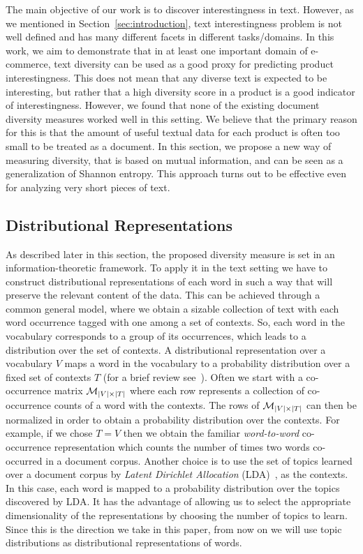 The main objective of our work is to discover interestingness in text. However,
as we mentioned in Section~\ref{sec:introduction}, text interestingness problem is not well defined and has many different facets in different tasks/domains. In this work, we aim to demonstrate that in at least one important domain of e-commerce, text diversity can be used as a good proxy for 
predicting product interestingness. This does not mean that any diverse text is
expected to be interesting, but rather that a high diversity score in
a product is a good indicator of interestingness. However, we found
that none of the existing document diversity measures worked well in this setting. We believe
that the primary reason for this is that the amount of useful textual
data for each product is often too small to be treated as a document. 
In this section, we propose a new way of measuring diversity, that is
based on mutual information, and can be seen as a generalization of
Shannon entropy. This approach turns out to be effective even for
analyzing very short pieces of text. 


\subsection{Distributional Representations}
\label{sec:distributional-representations}
As described later in this section, the proposed diversity measure
is set in an information-theoretic framework. 
To apply it in the text setting we have to construct distributional
representations of each word in such a way that will preserve the
relevant content of the data.
This can be achieved through a common general model,
where we obtain a sizable collection of text with each word
occurrence tagged with one among a set of
contexts. 
So, each word in the vocabulary
corresponds to a group of its occurrences, which leads to a
distribution over the set of contexts. A distributional representation
over a vocabulary $V$ maps a word in the vocabulary to a  
probability distribution over a fixed set of contexts $T$  (for a brief review
see~\cite{Turian10wordrepresentations}). Often we start with a
co-occurrence matrix ${\mathcal M}_{|V|\times|T|}$ where each row represents a
collection of co-occurrence counts of a word with the contexts. The
rows of ${\mathcal M}_{|V|\times|T|}$ can then  be normalized in order to
obtain a probability distribution over the contexts.
For example, if we chose $T=V$ then we obtain the familiar {\sl
  word-to-word} co-occurrence representation which counts the number 
of times two words co-occurred in a document corpus. Another choice is
to use the set of topics learned over a document 
corpus by {\sl Latent Dirichlet Allocation}
(LDA)~\cite{Blei:2003:LDA:944919.944937}, as the contexts. In this case, each word is mapped to a probability distribution over the topics discovered by LDA. It has the
advantage of allowing us to select the appropriate dimensionality of
the representations by choosing the number of topics to learn. Since
this is the direction we take in this paper, from now on we will use
topic distributions as distributional representations of words.


